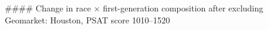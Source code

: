 #### Change in race × first-generation composition after excluding Geomarket: Houston, PSAT score 1010–1520
